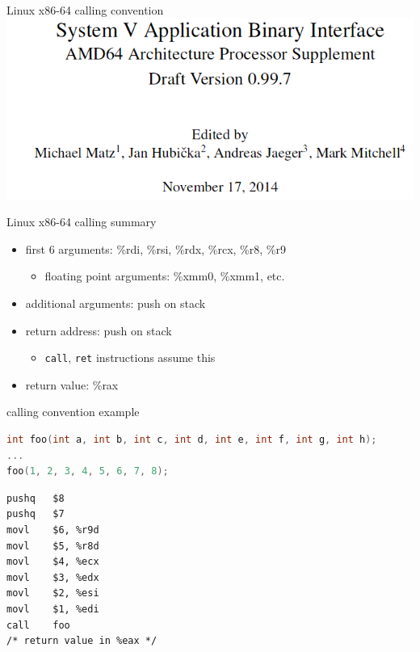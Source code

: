 \usetikzlibrary{arrows.meta,calc,matrix}

\begin{frame}{Linux x86-64 calling convention}
    \includegraphics[width=\textwidth]{../asm/sysv-abi-front}
\end{frame}

\begin{frame}{Linux x86-64 calling summary}
\begin{itemize}
    \item first 6 arguments: \%rdi, \%rsi, \%rdx, \%rcx, \%r8, \%r9
        \begin{itemize}
        \item floating point arguments: \%xmm0, \%xmm1, etc.
        \end{itemize}
    \item additional arguments: push on stack
    \item return address: push on stack
        \begin{itemize}
        \item {\tt call}, {\tt ret} instructions assume this
        \end{itemize}
    \item return value: \%rax
\end{itemize}
\end{frame}



\begin{frame}[fragile,label=conventionEx]{calling convention example}
\begin{lstlisting}[language=C,style=small]
int foo(int a, int b, int c, int d, int e, int f, int g, int h);
...
foo(1, 2, 3, 4, 5, 6, 7, 8);
\end{lstlisting}
\begin{lstlisting}[language=myasm,style=small]
pushq   $8
pushq   $7
movl    $6, %r9d
movl    $5, %r8d
movl    $4, %ecx
movl    $3, %edx
movl    $2, %esi
movl    $1, %edi
call    foo
/* return value in %eax */
\end{lstlisting}
\end{frame}

